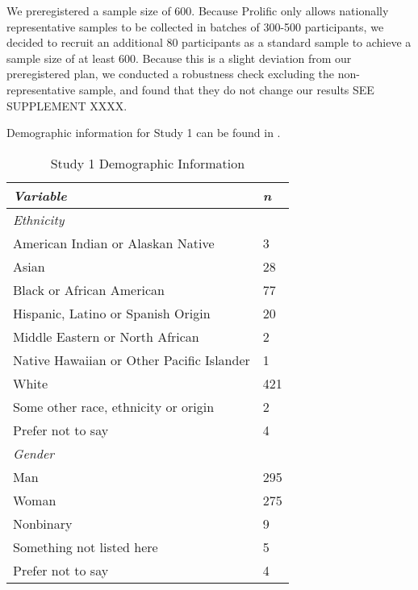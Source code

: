 \documentclass[12pt,]{article}
\begin{document}
We preregistered a sample size of 600. Because Prolific only allows nationally representative samples to be collected in batches of 300-500 participants, we decided to recruit an additional 80 participants as a standard sample to achieve a sample size of at least 600. Because this is a slight deviation from our preregistered plan, we conducted a robustness check excluding the non-representative sample, and found that they do not change our results SEE SUPPLEMENT XXXX.  

Demographic information for Study 1 can be found in .  

\clearpage

\begin{table}[ht]
    \centering
    \begin{tabular}{l l}
        \toprule
        \emph{Variable} & \emph{n} \\
        \midrule
        \emph{Ethnicity} &  \\
        \hspace{1em} American Indian or Alaskan Native & 3 \\
        \hspace{1em} Asian & 28 \\
        \hspace{1em} Black or African American & 77 \\
        \hspace{1em} Hispanic, Latino or Spanish Origin & 20 \\
        \hspace{1em} Middle Eastern or North African& 2 \\
        \hspace{1em} Native Hawaiian or Other Pacific Islander & 1 \\ 
        \hspace{1em} White & 421 \\ 
        \hspace{1em} Some other race, ethnicity or origin & 2 \\ 
        \hspace{1em} Prefer not to say & 4 \\ 
      \emph{Gender} & \\ 
         \hspace{1em} Man & 295 \\
         \hspace{1em} Woman & 275 \\
         \hspace{1em} Nonbinary & 9 \\
         \hspace{1em} Something not listed here & 5 \\
         \hspace{1em} Prefer not to say & 4 \\
        \bottomrule
    \end{tabular}
    \caption{Study 1 Demographic Information}
    \label{demo1}
\end{table}
\end{document}
